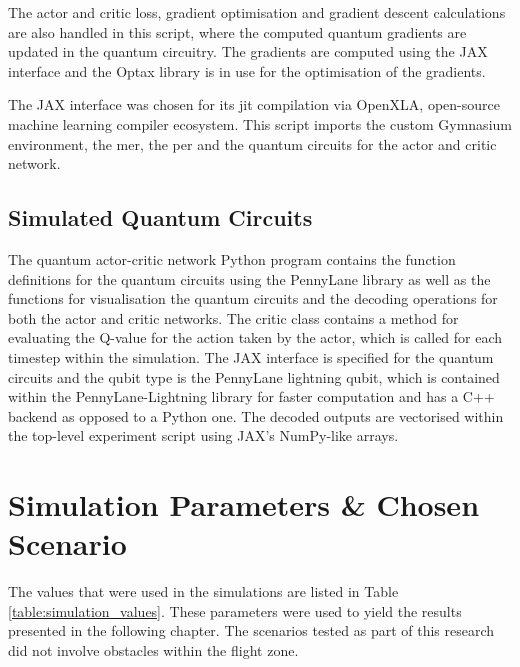 The actor and critic loss, gradient optimisation and gradient descent calculations are also handled in this script, where the computed quantum gradients are updated in the quantum circuitry. 
The gradients are computed using the JAX interface and the Optax library is in use for the optimisation of the gradients. 

The JAX interface was chosen for its \acrfull{jit} compilation via OpenXLA, open-source machine learning compiler ecosystem.
This script imports the custom Gymnasium environment, the \acrshort{mer}, the \acrshort{per} and the quantum circuits for the actor and critic network. 
\subsection{Simulated Quantum Circuits}
The quantum actor-critic network Python program contains the function definitions for the quantum circuits using the PennyLane library as well as the functions for visualisation the quantum circuits and the decoding operations for both the actor and critic networks. 
The critic class contains a method for evaluating the Q-value for the action taken by the actor, which is called for each timestep within the simulation.
The JAX interface is specified for the quantum circuits and the qubit type is the PennyLane lightning qubit, which is contained within the PennyLane-Lightning library for faster computation and has a C++ backend as opposed to a Python one. 
The decoded outputs are vectorised within the top-level experiment script using JAX's NumPy-like arrays. 
\section{Simulation Parameters \& Chosen Scenario}
The values that were used in the simulations are listed in Table \ref{table:simulation_values}.
These parameters were used to yield the results presented in the following chapter. 
The scenarios tested as part of this research did not involve obstacles within the flight zone.

